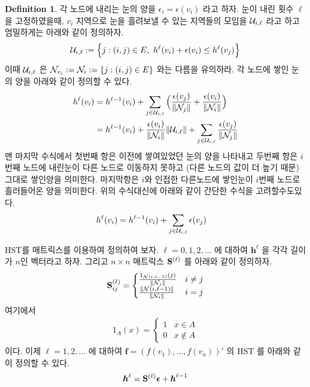 \documentclass[preprint, review, 12pt]{article}
\theoremstyle{definition}
\newtheorem{dfn}{Definition}
\theoremstyle{remark}
\begin{document}
\fi
\begin{dfn}

각 노드에 내리는 눈의 양을 $\epsilon_i=\epsilon(v_i)$ 라고 하자. 눈이 내린 횟수 $\ell$ 을 고정하였을때, $v_i$ 지역으로 눈을 흘려보낼 수 있는 지역들의 모임을 ${\cal U}_ {i,\ell}$ 라고 하고 엄밀하게는 아래와 같이 정의하자. 
\begin{align}
{\cal U}_ {i,\ell} := \Big\{j:(i,j)\in E , ~ h^{\ell}(v_i)+\epsilon(v_i) \leq h^{\ell}(v_j) \Big\} 
\end{align}
이때 ${\cal U}_ {i,\ell}$ 은 ${\cal N}_ {v_i}:={\cal N}_ i:=\{j: (i,j)\in E \}$ 와는 다름을 유의하라. 각 노드에 쌓인 눈의 양을 아래와 같이 정의할 수 있다. 
\begin{align}
h^{\ell}(v_i)&=h^{\ell-1}(v_i)+ \sum_{j \in {\cal U}_ {i,\ell} }\Big( \frac{\epsilon(v_j)}{\|{\cal N}_ j \| }+\frac{\epsilon(v_i)}{\|{\cal N}_ i \| }\Big)  \\
&= h^{\ell-1}(v_i)+ \frac{\epsilon(v_i)}{\|{\cal N}_ i \| }\|{\cal U}_ {i,\ell}\|+ \sum_{j \in {\cal U}_ {i,\ell} } \frac{\epsilon(v_j)}{\|{\cal N}_ j \| }
\end{align}
맨 마지막 수식에서 첫번째 항은 이전에 쌓여있었던 눈의 양을 나타내고 두번째 항은 $i$번째 노드에 내린눈이 다른 노드로 이동하지 못하고 (다른 노드의 값이 더 높기 때문) 그대로 쌓인양을 의미한다. 마지막항은 $i$와 인접한 다른노드에 쌓인눈이 $i$번째 노드로 흘러들어온 양을 의미한다. 위의 수식대신에 아래와 같이 간단한 수식을 고려할수도있다. 
\begin{align}
h^{\ell}(v_i)&=h^{\ell-1}(v_i)+ \sum_{j \in {\cal U}_ {i,\ell} } \epsilon(v_j)
\end{align}


 HST를 매트릭스를 이용하여 정의하여 보자. $\ell = 0,1,2,\dots $ 에 대하여 ${\boldsymbol h}^{\ell}$ 을 각각 길이가 $n$인 벡터라고 하자. 그리고 $n\times n$ 매트릭스 ${\bf S}^{(\ell)}$ 를 아래와 같이 정의하자. 
\begin{align}
{\bf S}^{(\ell)}_ {ij}=
\begin{cases} 
\frac{ 1_ { {\cal N}(i,\ell-1) }(j)}{\|{\cal N}_ j\|}  & i \neq j  \\
\frac{\|{\cal N}(i,\ell-1)\|}{\|{\cal N}_ i\|} & i=j
\end{cases} 
\end{align}
여기에서 
\begin{align}
1_A(x)=
\begin{cases}
1 & x \in A \\
0 & x \notin A 
\end{cases}
\end{align} 
이다. 이제 $\ell = 1,2,\dots $ 에 대하여 ${\boldsymbol f}=(f(v_1),\dots,f(v_n))'$ 의 HST 를 아래와 같이 정의할 수 있다. 
\begin{align}
{\boldsymbol h}^{\ell}= {\bf S}^{(\ell)} {\boldsymbol \epsilon}+ {\boldsymbol h}^{\ell-1} 
\end{align}


\end{dfn}
\end{document}
